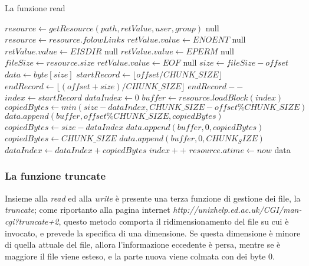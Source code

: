 \begin{algorithm}
\begin{algorithmic}[5]
\caption{La funzione read}
	\State $resource \gets getResource(path, retValue, user, group)$
		\State \Return null
	\EndIf
		\State $resource \gets resource.folowLinks$
	\EndIf
		\State $retValue.value \gets ENOENT$
		\State \Return null
		\State $retValue.value \gets EISDIR$
		\State \Return null
	\EndIf
		\State $retValue.value \gets EPERM$ 
		\State \Return null
	\EndIf
	\State $fileSize \gets resource.size$
		\State $retValue.value \gets EOF$ 
		\State \Return null
	\EndIf
		\State $size \gets fileSize - offset$
	\EndIf
	\State $data \gets byte[size]$
	\State $startRecord \gets \lfloor offset/CHUNK\_SIZE \rfloor$
	\State $endRecord \gets \lfloor (offset+size)/CHUNK\_SIZE \rfloor$
		\State $endRecord--$
	\EndIf
	\State $index \gets startRecord$
	\State $dataIndex \gets 0$
		\State $buffer \gets resource.loadBlock(index)$
			\State $copiedBytes \gets min(size-dataIndex, CHUNK\_SIZE - offset\%CHUNK\_SIZE)$
			\State $data.append(buffer, offset\%CHUNK\_SIZE, copiedBytes)$
			\State $copiedBytes \gets size-dataIndex$		
			\State $data.append(buffer, 0, copiedBytes)$	
		\Else
			\State $copiedBytes \gets CHUNK\_SIZE$
			\State $data.append(buffer, 0, CHUNK_SIZE)$
		\EndIf
			\State $dataIndex \gets dataIndex+copiedBytes$
			\State $index++$
	\EndWhile
	\State $resource.atime \gets now$
	\State \Return data
\EndFunction
\end{algorithmic}
\end{algorithm}

\newpage

\subsubsection{La funzione truncate}
Insieme alla \emph{read} ed alla \emph{write} è presente una terza funzione di gestione dei file, la \emph{truncate}; come riportanto alla pagina internet \emph{http://unixhelp.ed.ac.uk/CGI/man-cgi?truncate+2}, questo metodo comporta il ridimensionamento del file su cui è invocato, e prevede la specifica di una dimensione. Se questa dimensione è minore di quella attuale del file, allora l'informazione eccedente è persa, mentre se è maggiore il file viene esteso, e la parte nuova viene colmata con dei byte 0.

